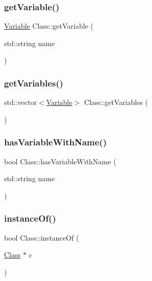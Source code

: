 \mbox{\label{classClass_a5c5de4f3c1419dedc92fc3d982fc6f65}} 
\subsubsection{\texorpdfstring{get\+Variable()}{getVariable()}}
{\footnotesize\ttfamily \hyperlink{classVariable}{Variable} Class\+::get\+Variable (\begin{DoxyParamCaption}\item[{std\+::string}]{name }\end{DoxyParamCaption})}

\mbox{\label{classClass_ab24282751aa8b0ba2b2c71fbd3eef7e5}} 
\subsubsection{\texorpdfstring{get\+Variables()}{getVariables()}}
{\footnotesize\ttfamily std\+::vector$<$\hyperlink{classVariable}{Variable}$>$ Class\+::get\+Variables (\begin{DoxyParamCaption}{ }\end{DoxyParamCaption})}

\mbox{\label{classClass_a0c5ffb0b7e3e95dedad01b8b4e91d93b}} 
\subsubsection{\texorpdfstring{has\+Variable\+With\+Name()}{hasVariableWithName()}}
{\footnotesize\ttfamily bool Class\+::has\+Variable\+With\+Name (\begin{DoxyParamCaption}\item[{std\+::string}]{name }\end{DoxyParamCaption})}

\mbox{\label{classClass_a9bbffa241c269033a12c76f85af9c5ac}} 
\subsubsection{\texorpdfstring{instance\+Of()}{instanceOf()}}
{\footnotesize\ttfamily bool Class\+::instance\+Of (\begin{DoxyParamCaption}\item[{\hyperlink{classClass}{Class} $\ast$}]{c }\end{DoxyParamCaption})}

